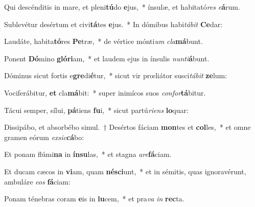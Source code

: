 \item Qui descénditis in mare, et pleni\textbf{tú}do \textbf{e}jus,~* ínsulæ, et habitató\textit{res} \textit{e}\textbf{á}rum.
\item Sublevétur desértum et civi\textbf{tá}tes \textbf{e}jus.~* In dómibus habi\textit{tá}\textit{bit} \textbf{Ce}dar:
\item Laudáte, habita\textbf{tó}res \textbf{Pe}træ,~* de vértice mónti\textit{um} \textit{cla}\textbf{má}bunt.
\item Ponent \textbf{Dó}mino \textbf{gló}\textbf{ri}am,~* et laudem ejus in ínsulis \textit{nun}\textit{ti}\textbf{á}bunt.
\item Dóminus sicut fortis e\textbf{gre}di\textbf{é}tur,~* sicut vir prœliátor susci\textit{tá}\textit{bit} \textbf{ze}lum:
\item Vociferábitur, \textbf{et} cla\textbf{má}bit:~* super inimícos suos \textit{con}\textit{for}\textbf{tá}bitur.
\item Tácui semper, sílui, \textbf{pá}tiens \textbf{fu}i,~* sicut partú\textit{ri}\textit{ens} \textbf{lo}quar:
\item Dissipábo, et absorbébo simul.~† Desértos fáciam \textbf{mon}tes et \textbf{col}les,~* et omne gramen eórum \textit{ex}\textit{sic}\textbf{cá}bo:
\item Et ponam flúmi\textbf{na} in \textbf{ín}\textbf{su}las,~* et stagna \textit{a}\textit{re}\textbf{fá}ciam.
\item Et ducam cæcos in \textbf{vi}am, quam \textbf{né}\textbf{sci}unt,~* et in sémitis, quas ignoravérunt, ambuláre \textit{e}\textit{os} \textbf{fá}ciam:
\item Ponam ténebras coram \textbf{e}is in \textbf{lu}cem,~* et pra\textit{va} \textit{in} \textbf{rec}ta.
